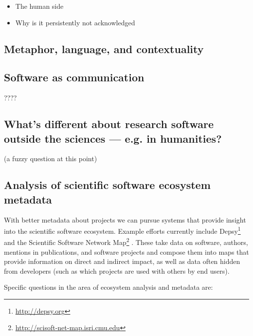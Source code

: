 \documentclass[a4paper,UKenglish]{dagman}
\begin{document}
\begin{itemize}
\item The human side
\item Why is it persistently not acknowledged
\end{itemize}

\subsection{Metaphor, language, and contextuality}

\subsection{Software as communication}

 ????


\subsection{What's different about research software outside the sciences --- e.g. in humanities?}

(a fuzzy question at this point)

\subsection{Analysis of scientific software ecosystem metadata}

With better metadata about projects we can pursue systems that provide insight into the scientific software ecosystem.
Example efforts currently include Depsy\footnote{\url{http://depsy.org}}  and the Scientific Software Network Map\footnote{\url{http://scisoft-net-map.isri.cmu.edu}} .
These take data on software, authors, mentions in publications, and software projects and compose them into maps that provide information on direct and indirect impact, as well as data often hidden from developers (such as which projects are used with others by end users).

Specific questions in the area of ecosystem analysis and metadata are:
\end{document}
